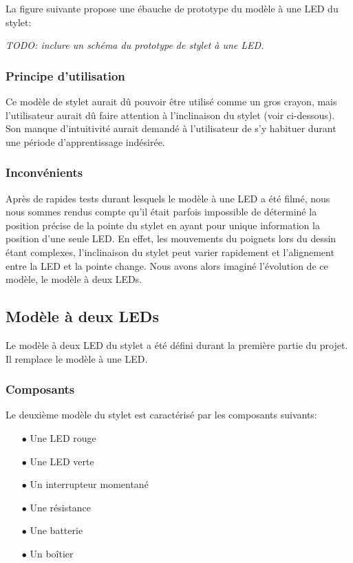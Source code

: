 \documentclass[11pt,a4paper,oldfontcommands]{memoir}
\begin{document}
La figure suivante propose une ébauche de prototype du modèle à une LED du stylet:

\textit{TODO: inclure un schéma du prototype de stylet à une LED.}

\subsubsection{Principe d'utilisation}

Ce modèle de stylet aurait dû pouvoir être utilisé comme un gros crayon, mais l'utilisateur aurait dû faire attention à l'inclinaison du stylet (voir ci-dessous). Son manque d'intuitivité aurait demandé à l'utilisateur de s'y habituer durant une période d'apprentissage indésirée.

\subsubsection{Inconvénients}

Après de rapides tests durant lesquels le modèle à une LED a été filmé, nous nous sommes rendus compte qu'il était parfois impossible de déterminé la position précise de la pointe du stylet en ayant pour unique information la position d'une seule LED. En effet, les mouvements du poignets lors du dessin étant complexes, l'inclinaison du stylet peut varier rapidement et l'alignement entre la LED et la pointe change.
Nous avons alors imaginé l'évolution de ce modèle, le modèle à deux LEDs.

\newpage

\subsection{Modèle à deux LEDs}

Le modèle à deux LED du stylet a été défini durant la première partie du projet. Il remplace le modèle à une LED.

\subsubsection{Composants}

Le deuxième modèle du stylet est caractérisé par les composants suivants:

\begin{itemize}
\item[$\bullet$] Une LED rouge
\item[$\bullet$] Une LED verte
\item[$\bullet$] Un interrupteur momentané
\item[$\bullet$] Une résistance
\item[$\bullet$] Une batterie
\item[$\bullet$] Un boîtier
\end{itemize}
\end{document}
